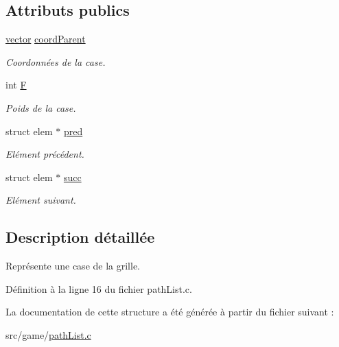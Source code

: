 \subsection*{Attributs publics}
\begin{DoxyCompactItemize}
\item 
\hypertarget{structtile_a64713fe43db6c82c33b08720d675e119}{}\hyperlink{structvector}{vector} \hyperlink{structtile_a64713fe43db6c82c33b08720d675e119}{coord\+Parent}\label{structtile_a64713fe43db6c82c33b08720d675e119}

\begin{DoxyCompactList}\small\item\em Coordonnées de la case. \end{DoxyCompactList}\item 
\hypertarget{structtile_a73c37972f791ab959c95a2be106a8ad1}{}int \hyperlink{structtile_a73c37972f791ab959c95a2be106a8ad1}{F}\label{structtile_a73c37972f791ab959c95a2be106a8ad1}

\begin{DoxyCompactList}\small\item\em Poids de la case. \end{DoxyCompactList}\item 
\hypertarget{structtile_afa70ec733d0bbb3f3bd02a76ab52b0fa}{}struct elem $\ast$ \hyperlink{structtile_afa70ec733d0bbb3f3bd02a76ab52b0fa}{pred}\label{structtile_afa70ec733d0bbb3f3bd02a76ab52b0fa}

\begin{DoxyCompactList}\small\item\em Elément précédent. \end{DoxyCompactList}\item 
\hypertarget{structtile_a3d827e1813ab650673b4fbe28e313b25}{}struct elem $\ast$ \hyperlink{structtile_a3d827e1813ab650673b4fbe28e313b25}{succ}\label{structtile_a3d827e1813ab650673b4fbe28e313b25}

\begin{DoxyCompactList}\small\item\em Elément suivant. \end{DoxyCompactList}\end{DoxyCompactItemize}


\subsection{Description détaillée}
Représente une case de la grille. 

Définition à la ligne 16 du fichier path\+List.\+c.



La documentation de cette structure a été générée à partir du fichier suivant \+:\begin{DoxyCompactItemize}
\item 
src/game/\hyperlink{pathList_8c}{path\+List.\+c}\end{DoxyCompactItemize}
